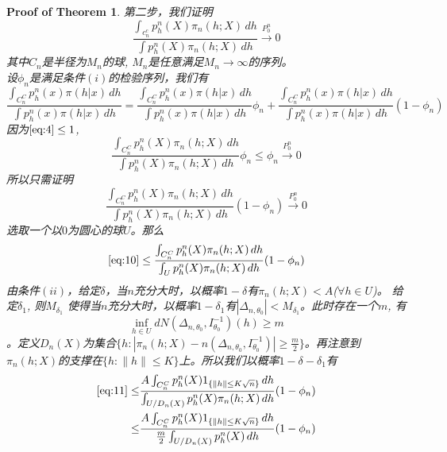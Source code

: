 \documentclass[review]{elsarticle}
\newtheorem{proofOfTheorem}{Proof of Theorem}
\begin{document}
\begin{proofOfTheorem}
第二步，我们证明
\begin{equation}\label{eq:4}
    \frac{\int_{c_n^c}p_h^n(X)\pi_n(h;X)\, dh}{\int p_h^n(X)\pi_n(h;X)\, dh}\xrightarrow{P_0^n}0
\end{equation}
其中$C_n$是半径为$M_n$的球, $M_n$是任意满足$M_n\to \infty$的序列。\\
设$\phi_n$是满足条件$(i)$的检验序列，我们有
\begin{equation}
    \frac{\int_{C_n^C}p_h^n(x)\pi(h|x)\, dh}{\int p_h^n(x)\pi(h|x)\, dh}= \frac{\int_{C_n^C}p_h^n(x)\pi(h|x)\, dh}{\int p_h^n(x)\pi(h|x)\, dh}\phi_n+ \frac{\int_{C_n^C}p_h^n(x)\pi(h|x)\, dh}{\int p_h^n(x)\pi(h|x)\, dh}(1-\phi_n)
\end{equation}
因为$\eqref{eq:4}\leq 1$, 
\begin{equation}
    \frac{\int_{C_n^C}p_h^n(X)\pi_n(h;X)\, dh}{\int p_h^n(X)\pi_n(h;X)\, dh}\phi_n\leq \phi_n\xrightarrow{P_0^n}0
\end{equation}
所以只需证明
\begin{equation}\label{eq:10}
    \frac{\int_{C_n^C}p_h^n(X)\pi_n(h;X)\, dh}{\int p_h^n(X)\pi_n(h;X)\, dh}(1-\phi_n)\xrightarrow{P_0^n}0
\end{equation}
选取一个以$0$为圆心的球$U$。那么
\begin{equation}\label{eq:11}
\eqref{eq:10}\leq \frac{\int_{C_n^C}p_h^n(X)\pi_n(h;X)\, dh}{\int_U p_h^n(X)\pi_n(h;X)\, dh}(1-\phi_n)
\end{equation}
由条件$(ii)$，给定$\delta$，当$n$充分大时，以概率$1-\delta$有$\pi_n(h;X)<A$($\forall h\in U$)。 给定$\delta_1$, 则$M_{\delta_1}$ 使得当$n$充分大时，以概率$1-\delta_1$有$|\Delta_{n,\theta_0}|<M_{\delta_1}$。此时存在一个$m$, 有
\begin{equation}
    \inf_{h\in U} dN(\Delta_{n,\theta_0},I_{\theta_0}^{-1})(h)\geq m
\end{equation}
。定义$D_n(X)$为集合$\{h: |\pi_{n}(h;X)-n(\Delta_{n,\theta_{0}},I_{\theta_{0}}^{-1})|\geq\frac{m}{2}\}$。再注意到$\pi_n(h;X)$的支撑在$\{h:\|h\|\leq K\}$上。所以我们以概率$1-\delta-\delta_1$有
\begin{equation}\label{eq:13}
    \begin{aligned}
        \eqref{eq:11}\leq&\frac{A\int_{C_n^C}p_h^n(X)1_{\{\|h\|\leq K\sqrt{n}\}}\, dh}{\int_{U/D_n(X)} p_h^n(X)\pi_n(h;X)\, dh}(1-\phi_n)\\
        \leq&\frac{A\int_{C_n^C}p_h^n(X)1_{\{\|h\|\leq K\sqrt{n}\}}\, dh}{\frac{m}{2}\int_{U/D_n(X)} p_h^n(X)\, dh}(1-\phi_n)\\
    \end{aligned}

\end{equation}
\end{proofOfTheorem}
\end{document}
